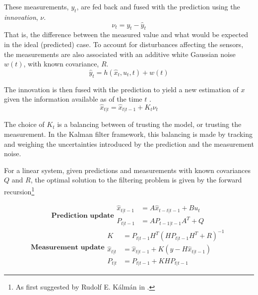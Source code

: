     These measurements, $y_{t}$, are fed back and fused with the
    prediction using the \textit{innovation}, $\nu$.
    \begin{equation}
        \nu_{t} = y_{t} - \hat{y}_{t}
    \end{equation}
    That is, the difference between the measured value and what would be
    expected in the ideal (predicted) case.
    To account for disturbances affecting the sensors, the measurements
    are also associated with an additive white Gaussian noise $w(t)$, with
    known covariance, $R$.
    \begin{equation}
        \hat{y}_{t} = h(\hat{x}_{t}, u_{t}, t) + w(t)
    \end{equation}

    The innovation is then fused with the prediction to yield a new
    estimation of $x$ given the
    information available as of the time $t$ \citep{gustafsson2010statistical}.
    \begin{equation}
        \hat{x}_{t|t} = \hat{x}_{t|t-1} + K_{t}\nu_{t}
    \end{equation}

    The choice of $K_{t}$ is a balancing between of trusting the model,
    or trusting the measurement. In the Kalman filter framework,
    this balancing is made by tracking and weighing the uncertainties
    introduced by the prediction and the measurement noise.

    \begin{algorithm}
        \label{alg:kf}
        For a linear system, given predictions and
        measurements with known covariances $Q$ and $R$, the optimal
        solution to the filtering problem is given by the forward recursion\footnote{As first suggested by Rudolf E. Kálmán in \cite{kalman1960}.}

        \begin{subequations}
            \textbf{Prediction update}
            \begin{align}
                \hat{x}_{t|t-1} &= A \hat{x}_{t-t|t-1} + B u_{t} \\
                P_{t|t-1} &= A P_{t-1|t-1} A^{T} + Q
            \end{align}
        \end{subequations}
        \begin{subequations}
            \textbf{Measurement update}
            \begin{align}
                K &= P_{t|t-1} H^{T} \left( H P_{t|t-1} H^{T} + R \right)^{-1}  \label{eq:observer:filtering:kalmanK} \\
                \hat{x}_{t|t} &= \hat{x}_{t|t-1} + K \left( y - H \hat{x}_{t|t-1} \right) \\
                P_{t|t} &= P_{t|t-1} + K H P_{t|t-1}
            \end{align}
        \end{subequations}
    \end{algorithm}

